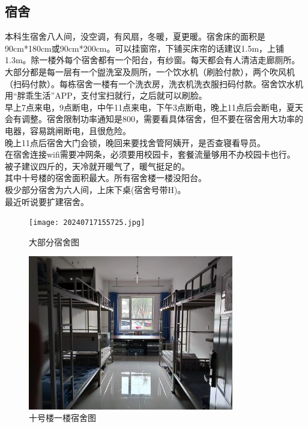 \documentclass[12pt]{article} %
\begin{document}
	\subsection{宿舍} %
	
本科生宿舍八人间，没空调，有风扇，冬暖，夏更暖。宿舍床的面积是90cm*180cm或90cm*200cm。可以挂窗帘，下铺买床帘的话建议1.5m，上铺1.3m。除一楼外每个宿舍都有一个阳台，有纱窗。每天都会有人清洁走廊厕所。\\

大部分都是每一层有一个盥洗室及厕所，一个饮水机（刷脸付款），两个吹风机（扫码付款）。每栋宿舍一楼有一个洗衣房，洗衣机洗衣服扫码付款。宿舍饮水机用“胖乖生活”APP，支付宝扫就行，之后就可以刷脸。\\

早上7点来电，9点断电，中午11点来电，下午3点断电，晚上11点后会断电，夏天会有调整。宿舍限制功率通知是800，需要看具体宿舍，但不要在宿舍用大功率的电器，容易跳闸断电，且很危险。\\

晚上11点后宿舍大门会锁，晚回来要找舍管阿姨开，是否查寝看导员。\\

在宿舍连接wifi需要冲网条，必须要用校园卡，套餐流量够用不办校园卡也行。\\

被子建议四斤的，天冷就开暖气了，暖气挺足的。\\

其中十号楼的宿舍面积最大。所有宿舍楼一楼没阳台。\\

极少部分宿舍为六人间，上床下桌(宿舍号带H)。\\

最近听说要扩建宿舍。

\begin{figure}[!h]
	\centering
	\texttt{[image: 20240717155725.jpg]}
	\caption{大部分宿舍图} %
\end{figure}
\begin{figure}[!h]
	\centering
	\includegraphics[width=0.8\textwidth]{202407251.jpg}
	\caption{十号楼一楼宿舍图} %
\end{figure}
\end{document}
